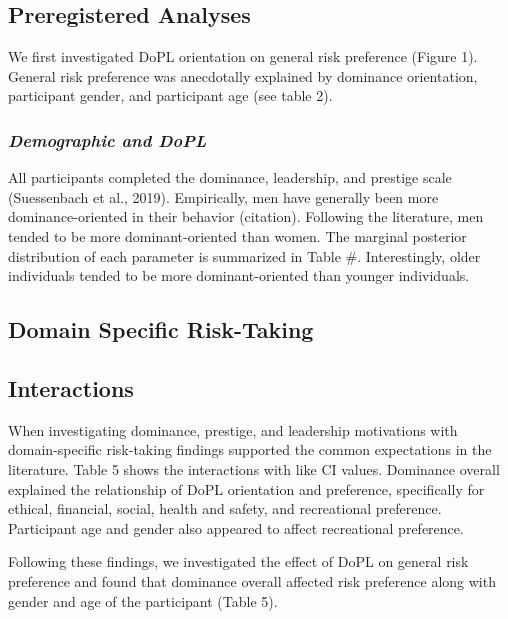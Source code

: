 \documentclass[
  english,
  ,doc, 12pt, a4paper,floatsintext]{apa7}
\begin{document}
\hypertarget{preregistered-analyses}{%
\subsection{Preregistered Analyses}\label{preregistered-analyses}}

We first investigated DoPL orientation on general risk preference (Figure 1). General risk preference was anecdotally explained by dominance orientation, participant gender, and participant age (see table 2).

\hypertarget{demographic-and-dopl}{%
\subsubsection{\texorpdfstring{\emph{Demographic and DoPL}}{Demographic and DoPL}}\label{demographic-and-dopl}}

All participants completed the dominance, leadership, and prestige scale (Suessenbach et al., 2019). Empirically, men have generally been more dominance-oriented in their behavior (citation). Following the literature, men tended to be more dominant-oriented than women. The marginal posterior distribution of each parameter is summarized in Table \#. Interestingly, older individuals tended to be more dominant-oriented than younger individuals.

\hypertarget{domain-specific-risk-taking}{%
\subsection{Domain Specific Risk-Taking}\label{domain-specific-risk-taking}}

\hypertarget{interactions}{%
\subsection{Interactions}\label{interactions}}

When investigating dominance, prestige, and leadership motivations with domain-specific risk-taking findings supported the common expectations in the literature. Table 5 shows the interactions with like CI values. Dominance overall explained the relationship of DoPL orientation and preference, specifically for ethical, financial, social, health and safety, and recreational preference. Participant age and gender also appeared to affect recreational preference.

Following these findings, we investigated the effect of DoPL on general risk preference and found that dominance overall affected risk preference along with gender and age of the participant (Table 5).
\end{document}
